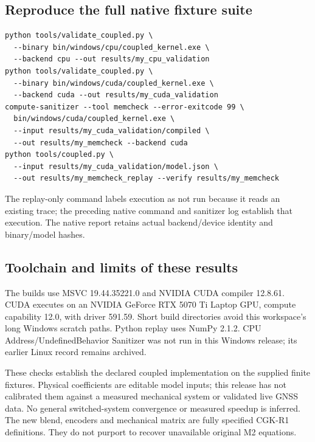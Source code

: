 \subsection{Reproduce the full native fixture suite}
\begin{lstlisting}
python tools/validate_coupled.py \
  --binary bin/windows/cpu/coupled_kernel.exe \
  --backend cpu --out results/my_cpu_validation
python tools/validate_coupled.py \
  --binary bin/windows/cuda/coupled_kernel.exe \
  --backend cuda --out results/my_cuda_validation
compute-sanitizer --tool memcheck --error-exitcode 99 \
  bin/windows/cuda/coupled_kernel.exe \
  --input results/my_cuda_validation/compiled \
  --out results/my_memcheck --backend cuda
python tools/coupled.py \
  --input results/my_cuda_validation/model.json \
  --out results/my_memcheck_replay --verify results/my_memcheck
\end{lstlisting}
The replay-only command labels execution as not run because it reads an existing
trace; the preceding native command and sanitizer log establish that execution.
The native report retains actual backend/device identity and binary/model hashes.

\subsection{Toolchain and limits of these results}
The builds use MSVC 19.44.35221.0 and NVIDIA CUDA compiler 12.8.61. CUDA executes
on an NVIDIA GeForce RTX 5070 Ti Laptop GPU, compute capability 12.0, with driver
591.59. Short build directories avoid this workspace's long Windows scratch paths.
Python replay uses NumPy 2.1.2. CPU Address/UndefinedBehavior Sanitizer was not run
in this Windows release; its earlier Linux record remains archived.

These checks establish the declared coupled implementation on the supplied finite
fixtures. Physical coefficients are editable model inputs; this release has not
calibrated them against a measured mechanical system or validated live GNSS data.
No general switched-system convergence or measured speedup is inferred. The new
blend, encoders and mechanical matrix are fully specified CGK-R1 definitions.
They do not purport to recover unavailable original M2 equations.
\clearpage
\clearpage
